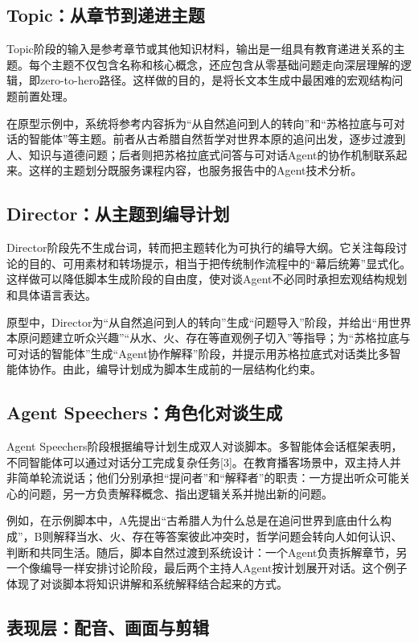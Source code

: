 \documentclass{rjthesis}
\begin{document}
\subsection{Topic：从章节到递进主题}

Topic阶段的输入是参考章节或其他知识材料，输出是一组具有教育递进关系的主题。每个主题不仅包含名称和核心概念，还应包含从零基础问题走向深层理解的逻辑，即zero-to-hero路径。这样做的目的，是将长文本生成中最困难的宏观结构问题前置处理。

在原型示例中，系统将参考内容拆为“从自然追问到人的转向”和“苏格拉底与可对话的智能体”等主题。前者从古希腊自然哲学对世界本原的追问出发，逐步过渡到人、知识与道德问题；后者则把苏格拉底式问答与可对话Agent的协作机制联系起来。这样的主题划分既服务课程内容，也服务报告中的Agent技术分析。

\subsection{Director：从主题到编导计划}

Director阶段先不生成台词，转而把主题转化为可执行的编导大纲。它关注每段讨论的目的、可用素材和转场提示，相当于把传统制作流程中的“幕后统筹”显式化。这样做可以降低脚本生成阶段的自由度，使对谈Agent不必同时承担宏观结构规划和具体语言表达。

原型中，Director为“从自然追问到人的转向”生成“问题导入”阶段，并给出“用世界本原问题建立听众兴趣”“从水、火、存在等直观例子切入”等指导；为“苏格拉底与可对话的智能体”生成“Agent协作解释”阶段，并提示用苏格拉底式对话类比多智能体协作。由此，编导计划成为脚本生成前的一层结构化约束。

\subsection{Agent Speechers：角色化对谈生成}

Agent Speechers阶段根据编导计划生成双人对谈脚本。多智能体会话框架表明，不同智能体可以通过对话分工完成复杂任务[3]。在教育播客场景中，双主持人并非简单轮流说话；他们分别承担“提问者”和“解释者”的职责：一方提出听众可能关心的问题，另一方负责解释概念、指出逻辑关系并抛出新的问题。

例如，在示例脚本中，A先提出“古希腊人为什么总是在追问世界到底由什么构成”，B则解释当水、火、存在等答案彼此冲突时，哲学问题会转向人如何认识、判断和共同生活。随后，脚本自然过渡到系统设计：一个Agent负责拆解章节，另一个像编导一样安排讨论阶段，最后两个主持人Agent按计划展开对话。这个例子体现了对谈脚本将知识讲解和系统解释结合起来的方式。

\subsection{表现层：配音、画面与剪辑}
\end{document}
